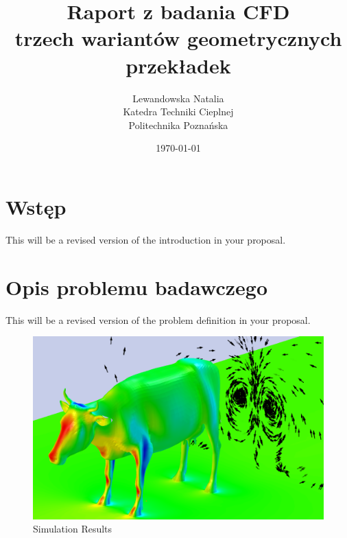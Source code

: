 \documentclass[peerreview]{IEEEtran}
\begin{document}
\title{Raport z badania CFD\\ trzech wariantów geometrycznych przekładek}



\author{Lewandowska Natalia \\
Katedra Techniki Cieplnej\\
Politechnika Poznańska\\
}
\date{\today}

\maketitle
\tableofcontents
\listoffigures
\listoftables

\IEEEpeerreviewmaketitle

\begin{abstract}

\lipsum[1]

\end{abstract}





\section{Wstęp}
This will be a revised version of the introduction in your proposal.

\section{Opis problemu badawczego}
This will be a revised version of the problem definition in your proposal.


\begin{figure}[!h]
\centering
\includegraphics[width=0.8\columnwidth]{placeholder} 
\caption{Simulation Results}
\label{fig_sim}
\end{figure}
\end{document}

